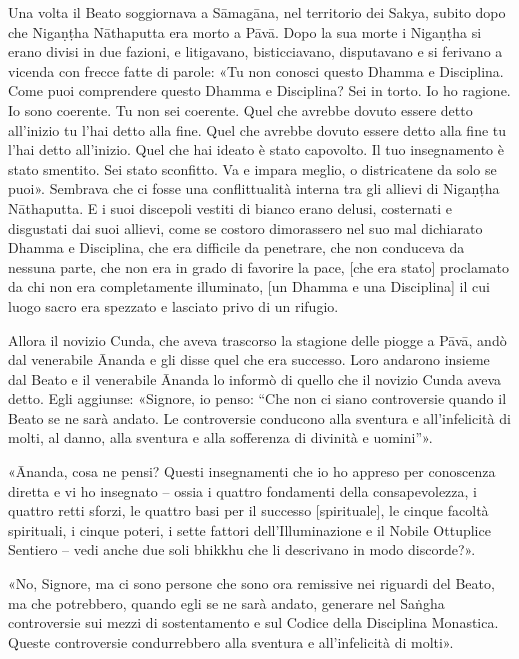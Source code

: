 Una volta il Beato soggiornava a Sāmagāna, nel territorio dei Sakya,
subito dopo che Nigaṇṭha Nāthaputta era morto a Pāvā. Dopo la sua morte
i Nigaṇṭha si erano divisi in due fazioni, e litigavano, bisticciavano,
disputavano e si ferivano a vicenda con frecce fatte di parole: «Tu non
conosci questo Dhamma e Disciplina. Come puoi comprendere questo Dhamma
e Disciplina? Sei in torto. Io ho ragione. Io sono coerente. Tu non sei
coerente. Quel che avrebbe dovuto essere detto all’inizio tu l’hai detto
alla fine. Quel che avrebbe dovuto essere detto alla fine tu l’hai detto
all’inizio. Quel che hai ideato è stato capovolto. Il tuo insegnamento è
stato smentito. Sei stato sconfitto. Va e impara meglio, o districatene
da solo se puoi». Sembrava che ci fosse una conflittualità interna tra
gli allievi di Nigaṇṭha Nāthaputta. E i suoi discepoli vestiti di bianco
erano delusi, costernati e disgustati dai suoi allievi, come se costoro
dimorassero nel suo mal dichiarato Dhamma e Disciplina, che era
difficile da penetrare, che non conduceva da nessuna parte, che non era
in grado di favorire la pace, [che era stato] proclamato da chi non era
completamente illuminato, [un Dhamma e una Disciplina] il cui luogo
sacro era spezzato e lasciato privo di un rifugio.


Allora il novizio Cunda, che aveva trascorso la stagione delle piogge a
Pāvā, andò dal venerabile Ānanda e gli disse quel che era successo. Loro
andarono insieme dal Beato e il venerabile Ānanda lo informò di quello
che il novizio Cunda aveva detto. Egli aggiunse: «Signore, io penso:
“Che non ci siano controversie quando il Beato se ne sarà andato. Le
controversie conducono alla sventura e all’infelicità di molti, al
danno, alla sventura e alla sofferenza di divinità e uomini”».


«Ānanda, cosa ne pensi? Questi insegnamenti che io ho appreso per
conoscenza diretta e vi ho insegnato – ossia i quattro fondamenti della
consapevolezza, i quattro retti sforzi, le quattro basi per il successo
[spirituale], le cinque facoltà spirituali, i cinque poteri, i sette
fattori dell’Illuminazione e il Nobile Ottuplice Sentiero – vedi anche
due soli bhikkhu che li descrivano in modo discorde?».


«No, Signore, ma ci sono persone che sono ora remissive nei riguardi del
Beato, ma che potrebbero, quando egli se ne sarà andato, generare nel
Saṅgha controversie sui mezzi di sostentamento e sul Codice della
Disciplina Monastica. Queste controversie condurrebbero alla sventura e
all’infelicità di molti».


